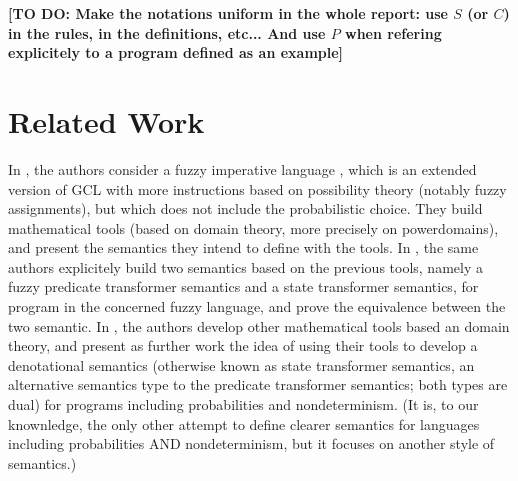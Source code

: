 \documentclass[a4paper,10pt]{llncs}
\newcommand\todo[1]{{\color{red}\textbf{[TO DO:  #1]}}}
\begin{document}
\todo{Make the notations uniform in the whole report: use $S$ (or $C$) in the rules, in the definitions, etc... And use $P$ when refering explicitely to a program defined as an example}
\section{Related Work}
\label{sec:related}

In \cite{WuChen08}, the authors consider a fuzzy imperative language \cite{Bueno93,Bueno97}, which is an extended version of GCL with more instructions based on possibility theory (notably fuzzy assignments), but which does not include the probabilistic choice. They build mathematical tools (based on domain theory, more precisely on powerdomains), and present the semantics they intend to define with the tools.
In \cite{WuChen12}, the same authors explicitely build two semantics based on the previous tools, namely a fuzzy predicate transformer semantics and a state transformer semantics, for program in the concerned fuzzy language, and prove the equivalence between the two semantic. In \cite{Tix09}, the authors develop other mathematical tools based an domain theory, and present as further work the idea of using their tools to develop a denotational semantics (otherwise known as state transformer semantics, an alternative semantics type to the predicate transformer semantics; both types are dual) for programs including probabilities and nondeterminism. (It is, to our knownledge, the only other attempt to define clearer semantics for languages including probabilities AND nondeterminism, but it focuses on another style of semantics.)



    
\end{document}
